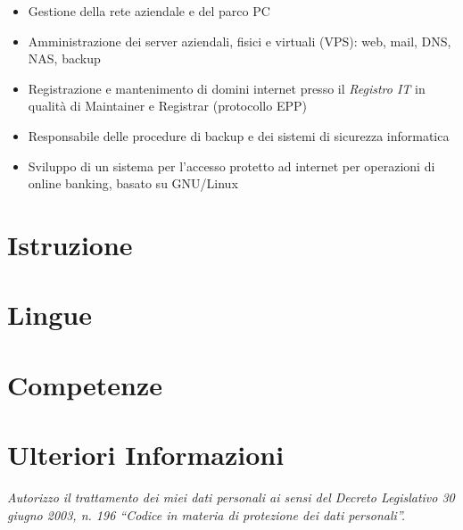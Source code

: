 \documentclass[a4paper, 11pt]{moderncv}
\begin{document}
        {\begin{itemize}
          \item Gestione della rete aziendale e del parco PC
          \item Amministrazione dei server aziendali, fisici e virtuali (VPS): web, mail, DNS, NAS, backup
          \item Registrazione e mantenimento di domini internet presso il \emph{Registro IT} in qualità di Maintainer e Registrar (protocollo EPP)
          \item Responsabile delle procedure di backup e dei sistemi di sicurezza informatica
          \item Sviluppo di un sistema per l'accesso protetto ad internet per operazioni di online banking, basato su GNU/Linux
        \end{itemize}}
\section{Istruzione}
\section{Lingue}
\vspace{5pt}
\section{Competenze}
\section{Ulteriori Informazioni}

\emptysection{}\closesection
\vfill
\begin{center}
\textit{\small Autorizzo il trattamento dei miei dati personali ai sensi del Decreto Legislativo 30 giugno 2003, n. 196 ``Codice in materia di protezione dei dati personali''.}
\end{center}
\end{document}
